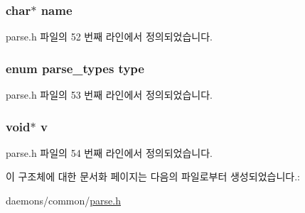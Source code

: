 \subsubsection[{\texorpdfstring{name}{name}}]{\setlength{\rightskip}{0pt plus 5cm}char$\ast$ name}\hypertarget{structparse__param_a5ac083a645d964373f022d03df4849c8}{}\label{structparse__param_a5ac083a645d964373f022d03df4849c8}


parse.\+h 파일의 52 번째 라인에서 정의되었습니다.

\subsubsection[{\texorpdfstring{type}{type}}]{\setlength{\rightskip}{0pt plus 5cm}enum {\bf parse\+\_\+types} type}\hypertarget{structparse__param_a0a166059b44f584dc5dbec3ef5690c76}{}\label{structparse__param_a0a166059b44f584dc5dbec3ef5690c76}


parse.\+h 파일의 53 번째 라인에서 정의되었습니다.

\subsubsection[{\texorpdfstring{v}{v}}]{\setlength{\rightskip}{0pt plus 5cm}void$\ast$ v}\hypertarget{structparse__param_a67806b49e20fb1170422969965db6ecb}{}\label{structparse__param_a67806b49e20fb1170422969965db6ecb}


parse.\+h 파일의 54 번째 라인에서 정의되었습니다.



이 구조체에 대한 문서화 페이지는 다음의 파일로부터 생성되었습니다.\+:\begin{DoxyCompactItemize}
\item 
daemons/common/\hyperlink{parse_8h}{parse.\+h}\end{DoxyCompactItemize}

